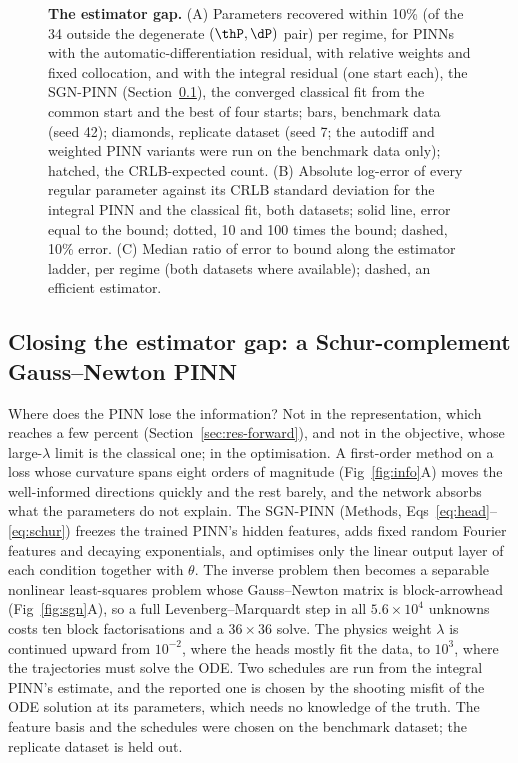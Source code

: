 \begin{figure}[tbp]
\centering
{}
\caption{\textbf{The estimator gap.} (A) Parameters recovered within 10\% (of the
34 outside the degenerate $(\thP,\dP)$ pair) per regime, for PINNs with the
automatic-differentiation residual, with relative weights and fixed
collocation, and with the integral residual (one start each), the SGN-PINN
(Section~\ref{sec:res-sgn}), the converged classical fit from the common start
and the best of four starts; bars, benchmark data (seed 42); diamonds,
replicate dataset (seed 7; the autodiff and weighted PINN variants were run on
the benchmark data only); hatched, the CRLB-expected count. (B) Absolute
log-error of every regular parameter against its CRLB standard deviation for
the integral PINN and the classical fit, both datasets; solid line, error equal
to the bound; dotted, 10 and 100 times the bound; dashed, 10\% error. (C) Median
ratio of error to bound along the estimator ladder, per regime (both datasets
where available); dashed, an
efficient estimator.}
\label{fig:gap}
\end{figure}

\subsection{Closing the estimator gap: a Schur-complement Gauss--Newton PINN}
\label{sec:res-sgn}

Where does the PINN lose the information? Not in the representation, which
reaches a few percent (Section~\ref{sec:res-forward}), and not in the objective,
whose large-$\lambda$ limit is the classical one; in the optimisation. A
first-order method on a loss whose curvature spans eight orders of magnitude
(Fig~\ref{fig:info}A) moves the well-informed directions quickly and the rest
barely, and the network absorbs what the parameters do not explain. The
SGN-PINN (Methods, Eqs~\eqref{eq:head}--\eqref{eq:schur}) freezes the trained
PINN's hidden features, adds fixed random Fourier features and decaying
exponentials, and optimises only the linear output layer of each condition
together with $\theta$. The inverse problem then becomes a separable nonlinear
least-squares problem whose Gauss--Newton matrix is block-arrowhead
(Fig~\ref{fig:sgn}A), so a full Levenberg--Marquardt step in all
$5.6\times10^4$ unknowns costs ten block factorisations and a $36\times36$
solve. The physics weight $\lambda$ is continued upward from $10^{-2}$, where the
heads mostly fit the data, to $10^3$, where the trajectories must solve the
ODE. Two schedules are run from the integral PINN's estimate, and the reported
one is chosen by the shooting misfit of the ODE solution at its parameters,
which needs no knowledge of the truth. The feature basis and the schedules
were chosen on the benchmark dataset; the replicate dataset is held out.

